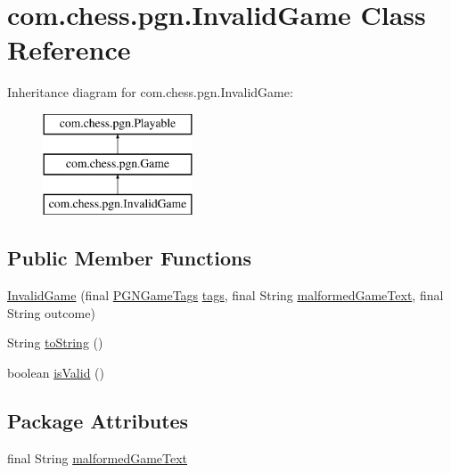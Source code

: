 \hypertarget{classcom_1_1chess_1_1pgn_1_1_invalid_game}{}\section{com.\+chess.\+pgn.\+Invalid\+Game Class Reference}
\label{classcom_1_1chess_1_1pgn_1_1_invalid_game}
Inheritance diagram for com.\+chess.\+pgn.\+Invalid\+Game\+:\begin{figure}[H]
\begin{center}
\leavevmode
\includegraphics[height=3.000000cm]{classcom_1_1chess_1_1pgn_1_1_invalid_game}
\end{center}
\end{figure}
\subsection*{Public Member Functions}
\begin{DoxyCompactItemize}
\item 
\mbox{\hyperlink{classcom_1_1chess_1_1pgn_1_1_invalid_game_af9e0ecfb14cc767a6b581531ae79e88f}{Invalid\+Game}} (final \mbox{\hyperlink{classcom_1_1chess_1_1pgn_1_1_p_g_n_game_tags}{P\+G\+N\+Game\+Tags}} \mbox{\hyperlink{classcom_1_1chess_1_1pgn_1_1_game_aadfd202e33d988f6c6520ffea05908c6}{tags}}, final String \mbox{\hyperlink{classcom_1_1chess_1_1pgn_1_1_invalid_game_ab7e96fc7a82d4999cb47351b0218fbba}{malformed\+Game\+Text}}, final String outcome)
\item 
String \mbox{\hyperlink{classcom_1_1chess_1_1pgn_1_1_invalid_game_a3070fc9933a8b0b7a9f587fb15e670fc}{to\+String}} ()
\item 
boolean \mbox{\hyperlink{classcom_1_1chess_1_1pgn_1_1_invalid_game_a482beca1cd8dabe2189a4fb82ec31020}{is\+Valid}} ()
\end{DoxyCompactItemize}
\subsection*{Package Attributes}
\begin{DoxyCompactItemize}
\item 
final String \mbox{\hyperlink{classcom_1_1chess_1_1pgn_1_1_invalid_game_ab7e96fc7a82d4999cb47351b0218fbba}{malformed\+Game\+Text}}
\end{DoxyCompactItemize}
